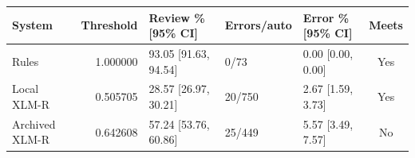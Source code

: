 \begin{tabular}{lrlllc}
\toprule
System & Threshold & Review \% [95\% CI] & Errors/auto & Error \% [95\% CI] & Meets \\
\midrule
Rules & 1.000000 & 93.05 [91.63, 94.54] & 0/73 & 0.00 [0.00, 0.00] & Yes \\
Local XLM-R & 0.505705 & 28.57 [26.97, 30.21] & 20/750 & 2.67 [1.59, 3.73] & Yes \\
Archived XLM-R & 0.642608 & 57.24 [53.76, 60.86] & 25/449 & 5.57 [3.49, 7.57] & No \\
\bottomrule
\end{tabular}
